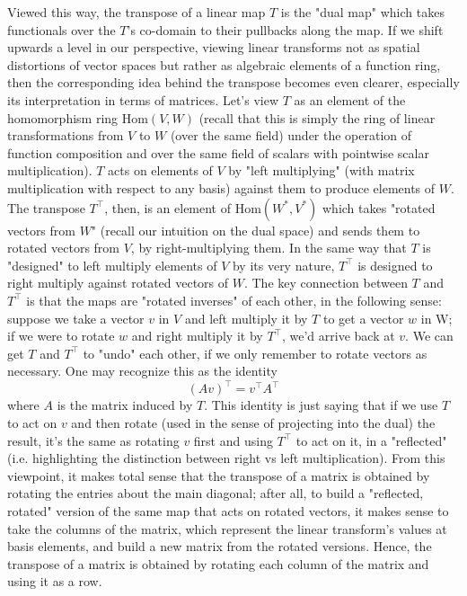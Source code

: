 \documentclass{article}
\newcommand{\Hom}{\text{Hom}}
\begin{document}
Viewed this way, the transpose of a linear map $ T $ is the "dual map" which takes functionals over the $ T $'s co-domain to their pullbacks along the map. If we shift upwards a level in our perspective, viewing linear transforms not as spatial distortions of vector spaces but rather as algebraic elements of a function ring, then the corresponding idea behind the transpose becomes even clearer, especially its interpretation in terms of matrices. Let's view $ T $ as an element of the homomorphism ring $ \Hom(V, W) $ (recall that this is simply the ring of linear transformations from $ V $ to $ W $ (over the same field) under the operation of function composition and over the same field of scalars with pointwise scalar multiplication). $ T $ acts on elements of $ V $ by "left multiplying" (with matrix multiplication with respect to any basis) against them to produce elements of $ W $. The transpose $ T^\intercal $, then, is an element of $ \Hom(W^*, V^*) $ which takes "rotated vectors from $ W $" (recall our intuition on the dual space) and sends them to rotated vectors from $ V $, by right-multiplying them. In the same way that $ T $ is "designed" to left multiply elements of $ V $ by its very nature, $ T^\intercal $ is designed to right multiply against rotated vectors of $ W $. The key connection between $ T $ and $ T^\intercal $ is that the maps are "rotated inverses" of each other, in the following sense: suppose we take a vector $ v $ in $ V $ and left multiply it by $ T $ to get a vector $ w $ in W; if we were to rotate $ w $ and right multiply it by $ T^\intercal $, we'd arrive back at $ v $. We can get $ T $ and $ T^\intercal $ to "undo" each other, if we only remember to rotate vectors as necessary. One may recognize this as the identity
    $$ (A v)^\intercal = v^\intercal A^\intercal $$
where $ A $ is the matrix induced by $ T $. This identity is just saying that if we use $ T $ to act on $ v $ and then rotate (used in the sense of projecting into the dual) the result, it's the same as rotating $ v $ first and using $ T^\intercal $ to act on it, in a "reflected" (i.e. highlighting the distinction between right vs left multiplication). From this viewpoint, it makes total sense that the transpose of a matrix is obtained by rotating the entries about the main diagonal; after all, to build a "reflected, rotated" version of the same map that acts on rotated vectors, it makes sense to take the columns of the matrix, which represent the linear transform's values at basis elements, and build a new matrix from the rotated versions. Hence, the transpose of a matrix is obtained by rotating each column of the matrix and using it as a row.
\end{document}
